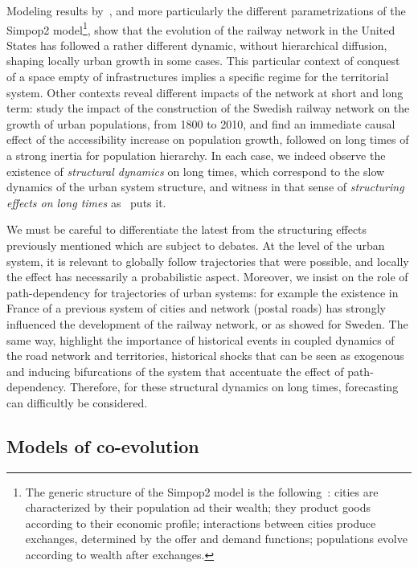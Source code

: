 Modeling results by~\cite{bretagnolle2010comparer}, and more particularly the different parametrizations of the Simpop2 model\footnote{The generic structure of the Simpop2 model is the following~\cite{pumain2008socio}: cities are characterized by their population ad their wealth; they product goods according to their economic profile; interactions between cities produce exchanges, determined by the offer and demand functions; populations evolve according to wealth after exchanges.}, show that the evolution of the railway network in the United States has followed a rather different dynamic, without hierarchical diffusion, shaping locally urban growth in some cases. This particular context of conquest of a space empty of infrastructures implies a specific regime for the territorial system. Other contexts reveal different impacts of the network at short and long term: \cite{berger2017locomotives} study the impact of the construction of the Swedish railway network on the growth of urban populations, from 1800 to 2010, and find an immediate causal effect of the accessibility increase on population growth, followed on long times of a strong inertia for population hierarchy. In each case, we indeed observe the existence of \emph{structural dynamics} on long times, which correspond to the slow dynamics of the urban system structure, and witness in that sense of \emph{structuring effects on long times} as~\cite{pumain2014effets} puts it.

We must be careful to differentiate the latest from the structuring effects previously mentioned which are subject to debates. At the level of the urban system, it is relevant to globally follow trajectories that were possible, and locally the effect has necessarily a probabilistic aspect. Moreover, we insist on the role of path-dependency for trajectories of urban systems: for example the existence in France of a previous system of cities and network (postal roads) has strongly influenced the development of the railway network, or as \cite{berger2017locomotives} showed for Sweden. The same way, \cite{doi:10.1068/b39089} highlight the importance of historical events in coupled dynamics of the road network and territories, historical shocks that can be seen as exogenous and inducing bifurcations of the system that accentuate the effect of path-dependency. Therefore, for these structural dynamics on long times, forecasting can difficultly be considered.


\subsection{Models of co-evolution}

